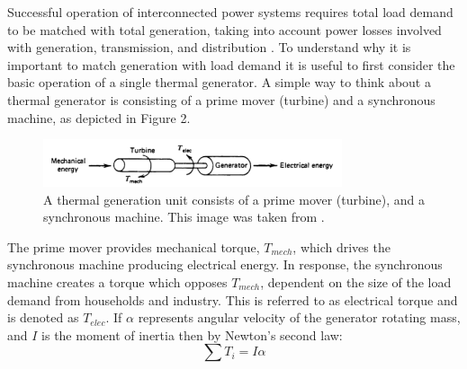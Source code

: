 \documentclass[12pt, a4paper]{article}
\begin{document}
Successful operation of interconnected power systems requires total load demand to be matched with total generation, taking into account power losses involved with generation, transmission, and distribution \cite{Wood2013}. To understand why it is important to match generation with load demand it is useful to first consider the basic operation of a single thermal generator. A simple way to think about a thermal generator is consisting of a prime mover (turbine) and a synchronous machine, as depicted in Figure 2.
\begin{figure}[h]
\centering
\includegraphics[height=1.4cm]{generation}
\caption{A thermal generation unit consists of a prime mover (turbine), and a synchronous machine. This image was taken from \cite{Wood2013}.}
\end{figure}

The prime mover provides mechanical torque, $T_{mech}$, which drives the synchronous machine producing electrical energy. In response, the synchronous machine creates a torque which opposes $T_{mech}$, dependent on the size of the load demand from households and industry. This is referred to as electrical torque and is denoted as $T_{elec}$. If $\alpha$ represents angular velocity of the generator rotating mass, and $I$ is the moment of inertia then by Newton's second law:
\begin{equation}
\sum T_i = I \alpha 
\end{equation}
\end{document}
